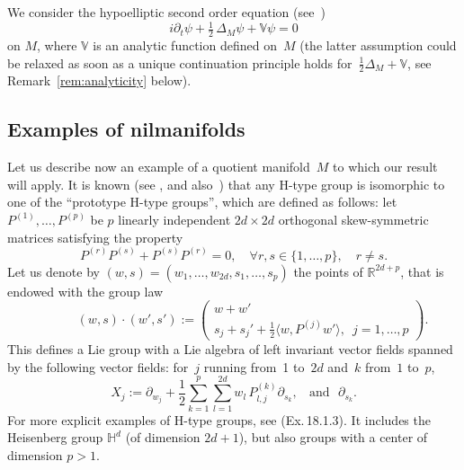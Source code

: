 \documentclass[JEP,XML,SOM,Unicode,published]{cedram}
\theoremstyle{plain}
\theoremstyle{definition}
\def\R{{\mathbb R}}
\def\bbH{{\mathbb H}}
\def\bbV{{\mathbb V}}
\begin{document}
We consider the
hypoelliptic second order equation (see~\cite{Hor67})
\begin{equation} \label{e:Schrod}
i\partial_t \psi+\tfrac 12\, \Delta_M \psi +\bbV \psi =0
\end{equation}
on $M$, where $\bbV$ is an analytic function defined on~$M$ (the latter assumption could be relaxed as soon as a unique continuation principle holds for~$\frac12\Delta_M+\bbV$, see Remark~\ref{rem:analyticity} below).

\subsection{Examples of nilmanifolds}\label{s:exampleinheis}
Let us describe now an example of a quotient manifold~$M$ to which our result will apply. It is known (see \cite[Th.\,18.2.1]{BLU}, and also~\cite{BFG2}) that any H-type group is isomorphic to one of the ``prototype H-type groups'', which are defined as follows:
let $P^{(1)},\ldots,P^{(p)}$ be $p$ linearly independent $2d \times 2d$ orthogonal skew-symmetric matrices satisfying the property
\[
P^{(r)}P^{(s)}+P^{(s)}P^{(r)}=0,\quad
\forall r,s \in \{1,\dots,p \},\quad r \neq s.
\]
Let us denote by
$ ({w},s)=({w_1,\dots,w_{2d}},s_1,\dots,s_p)$
the points of $\R^{2d+p}$, that is endowed with the group law
\begin{equation*}
\quad \quad \quad ({w},s) \cdot ({w'},s'):=\begin{pmatrix}
w+w' \\s_j+s_j'+\frac12 \langle w, P^{(j)}w' \rangle,\,\,\,j=1,\dots,p
\end{pmatrix}.
\end{equation*}
This defines a Lie group with a Lie algebra of left invariant vector fields
spanned by the following vector fields: for~$
j$ running from~1 to~$2d$ and~$k$ from~$ 1$ to~$p$,
\begin{equation*}
X_j\! :=\!\partial_{w_j} + \frac 1 2 \sum^{p}_{k=1}\sum^{2d}_{l=1}w_l \, P_{l,j}^{(k)}\partial_{s_k}, \ \ \ \ \text{and} \ \ \ \partial_{s_k}.
\end{equation*}
For more explicit examples of H-type groups, see \cite[\S 18.1]{BLU} (\eg Ex.\,18.1.3). It includes the Heisenberg group $\bbH^d$ (of dimension $2d+1$), but also groups with a center of dimension $p>1$.
\end{document}
